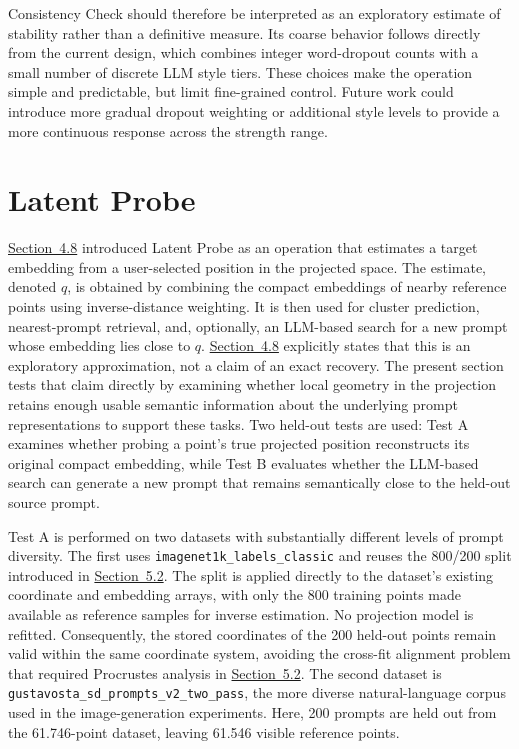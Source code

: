 Consistency Check should therefore be interpreted as an exploratory estimate of stability rather than a definitive measure. Its coarse behavior follows directly from the current design, which combines integer word-dropout counts with a small number of discrete LLM style tiers. These choices make the operation simple and predictable, but limit fine-grained control. Future work could introduce more gradual dropout weighting or additional style levels to provide a more continuous response across the strength range.

\FloatBarrier
\section{Latent Probe}\label{sec:5.7}

\hyperref[sec:4.8]{Section~4.8} introduced Latent Probe as an operation that estimates a target embedding from a user-selected position in the projected space. The estimate, denoted $q$, is obtained by combining the compact embeddings of nearby reference points using inverse-distance weighting. It is then used for cluster prediction, nearest-prompt retrieval, and, optionally, an LLM-based search for a new prompt whose embedding lies close to $q$. \hyperref[sec:4.8]{Section~4.8} explicitly states that this is an exploratory approximation, not a claim of an exact recovery. The present section tests that claim directly by examining whether local geometry in the projection retains enough usable semantic information about the underlying prompt representations to support these tasks. Two held-out tests are used: Test A examines whether probing a point's true projected position reconstructs its original compact embedding, while Test B evaluates whether the LLM-based search can generate a new prompt that remains semantically close to the held-out source prompt.

Test A is performed on two datasets with substantially different levels of prompt diversity. The first uses \texttt{imagenet1k\_labels\_classic} and reuses the 800/200 split introduced in \hyperref[sec:5.2]{Section~5.2}. The split is applied directly to the dataset's existing coordinate and embedding arrays, with only the 800 training points made available as reference samples for inverse estimation. No projection model is refitted. Consequently, the stored coordinates of the 200 held-out points remain valid within the same coordinate system, avoiding the cross-fit alignment problem that required Procrustes analysis in \hyperref[sec:5.2]{Section~5.2}. The second dataset is \texttt{gustavosta\_sd\_prompts\_v2\_two\_pass}, the more diverse natural-language corpus used in the image-generation experiments. Here, 200 prompts are held out from the 61.746-point dataset, leaving 61.546 visible reference points.

